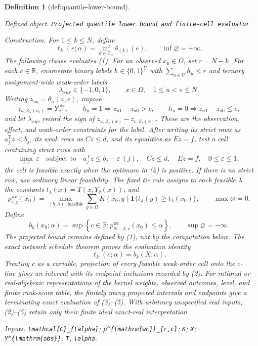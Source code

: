 \documentclass{article}
\newtheorem{definition}{Definition}
\begin{document}
\begin{definition}[def:quantile-lower-bound]\label{def:quantile-lower-bound}
\par\smallskip\noindent\emph{Defined object.} \texttt{Projected quantile lower bound and finite-\allowbreak{}cell evaluator}
\par\smallskip\noindent\emph{Construction.} For \(1\leq k\leq N\), define
\[
\ell_k(e;\alpha)
=\inf_{\theta\in\mathcal C_{\alpha}}\theta_{(k)}(e),
\qquad
\inf\varnothing=+\infty.
\tag{1}
\]
The following clause evaluates (1).  For an observed \(x_0\in\Omega\), set
\(r=N-k\).  For each \(c\in\mathbb R\), enumerate binary labels
\(h\in\{0,1\}^{U}\) with \(\sum_{u\in U}h_u\leq r\) and ternary
assignment-wide weak-order labels
\[
\lambda_{xuv}\in\{-1,0,1\},
\qquad x\in\Omega,\quad 1\leq u<v\leq N.
\]
Writing \(z_{ua}=\theta_u(a,e)\), impose
\[
z_{u,Z_u(x_0)}=Y_u^{\mathrm{obs}},
\qquad
h_u=1\Longrightarrow z_{u1}-z_{u0}>c,
\qquad
h_u=0\Longrightarrow z_{u1}-z_{u0}\leq c,
\]
and let \(\lambda_{xuv}\) record the sign of
\(z_{u,Z_u(x)}-z_{v,Z_v(x)}\).  These are the observation, effect, and
weak-order constraints for the label.
After writing its strict rows as \(a_j^{\mathsf T}z<b_j\), its weak rows as
\(Cz\leq d\), and its equalities as \(Ez=f\), test a cell containing strict
rows with
\[
\max_{z,\varepsilon}\ \varepsilon
\quad\text{subject to}\quad
a_j^{\mathsf T}z\leq b_j-\varepsilon\ (j),
\quad Cz\leq d,
\quad Ez=f,
\quad 0\leq\varepsilon\leq1;
\tag{2}
\]
the cell is feasible exactly when the optimum in (2) is positive.  If there is
no strict row, use ordinary linear feasibility.  The fixed tie rule assigns to
each feasible \(\lambda\) the constants
\(t_{\lambda}(x)=T(x,Y_{\theta}(x))\), and
\[
p^{\mathrm{wc}}_{r,c}(x_0)
=\max_{(h,\lambda):\,\mathrm{feasible}}
\sum_{y\in\Omega}K(x_0,y)
\mathbf 1\{t_{\lambda}(y)\geq t_{\lambda}(x_0)\},
\qquad \max\varnothing=0.
\tag{3}
\]
Define
\[
b_k(x_0;\alpha)
=\sup\left\{c\in\mathbb R:
p^{\mathrm{wc}}_{N-k,c}(x_0)\leq\alpha\right\},
\qquad \sup\varnothing=-\infty.
\tag{4}
\]
The projected bound remains defined by (1), not by the computation below.  The
exact network schedule theorem proves the evaluation identity
\[
\ell_k(e;\alpha)=b_k(X;\alpha).
\tag{5}
\]
Treating \(c\) as a variable, projection of every feasible weak-order cell onto
the \(c\)-line gives an interval with its endpoint inclusions recorded by (2).
For rational or real-algebraic representations of the kernel weights, observed
outcomes, level, and finite rank-score table, the finitely many projected
intervals and endpoints give a terminating exact evaluation of (3)--(5).  With
arbitrary unspecified real inputs, (2)--(5) retain only their finite ideal
exact-real interpretation.
\par\smallskip\noindent\emph{Inputs.} \texttt{\textbackslash{}\allowbreak{}mathcal\{C\}\allowbreak{}\_\allowbreak{}\{\textbackslash{}\allowbreak{}alpha\}\allowbreak{}}; \texttt{p\textasciicircum{}\{\textbackslash{}\allowbreak{}mathrm\{wc\}\allowbreak{}\}\allowbreak{}\_\allowbreak{}\{r,\allowbreak{}c\}\allowbreak{}}; \texttt{K}; \texttt{X}; \texttt{Y\textasciicircum{}\{\textbackslash{}\allowbreak{}mathrm\{obs\}\allowbreak{}\}\allowbreak{}}; \texttt{T}; \texttt{\textbackslash{}\allowbreak{}alpha}.
\end{definition}
\end{document}
